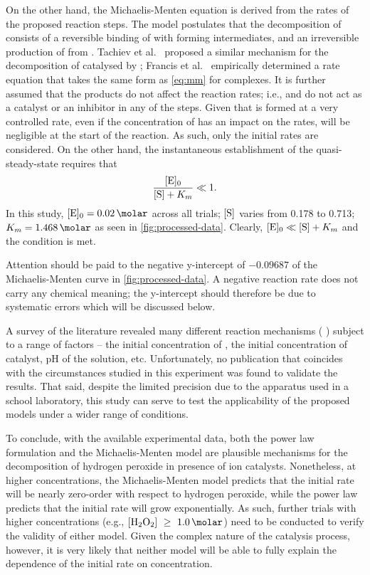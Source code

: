 \documentclass[a4paper, 12pt]{article}
\begin{document}
On the other hand, the Michaelis-Menten equation is derived from the rates of the proposed reaction steps. The model postulates that the decomposition of  consists of a reversible binding of  with  forming  intermediates, and an irreversible production of  from . Tachiev et al.~\cite{tachiev} proposed a similar mechanism for the decomposition of  catalysed by ; Francis et al.~\cite{Fe_mm} empirically determined a rate equation that takes the same form as \cref{eq:mm} for  complexes. It is further assumed that the products do not affect the reaction rates; i.e.,  and  do not act as a catalyst or an inhibitor in any of the steps. Given that  is formed at a very controlled rate, even if the concentration of  has an impact on the rates, \ce{[O2]} will be negligible at the start of the reaction. As such, only the initial rates are considered. On the other hand, the instantaneous establishment of the quasi-steady-state requires that~\cite{mathematical_biology} \[ \frac{\ce{[E]_0}}{\ce{[S]} + K_m} \ll 1 . \] In this study, $\ce{[E]_0} = \SI{0.02}{\molar}$ across all trials; $\ce{[S]}$ varies from \SI{0.178}{\molar} to \SI{0.713}{\molar}; $K_m = \SI{1.468}{\molar}$ as seen in \cref{fig:processed-data}. Clearly, $\ce{[E]_0} \ll \ce{[S]} + K_m$ and the condition is met.

Attention should be paid to the negative y-intercept of $-0.09687$ of the Michaelis-Menten curve in \cref{fig:processed-data}. A negative reaction rate does not carry any chemical meaning; the y-intercept should therefore be due to systematic errors which will be discussed below.

A survey of the literature revealed many different reaction mechanisms (\cite{pseudo_first_order} \cite{Fe_mm} \cite{de_laat} \cite{tachiev}) subject to a range of factors -- the initial concentration of , the initial concentration of  catalyst, pH of the solution, etc. Unfortunately, no publication that coincides with the circumstances studied in this experiment was found to validate the results. That said, despite the limited precision due to the apparatus used in a school laboratory, this study can serve to test the applicability of the proposed models under a wider range of conditions.

To conclude, with the available experimental data, both the power law formulation and the Michaelis-Menten model are plausible mechanisms for the decomposition of hydrogen peroxide in presence of  ion catalysts. Nonetheless, at higher  concentrations, the Michaelis-Menten model predicts that the initial rate will be nearly zero-order with respect to hydrogen peroxide, while the power law predicts that the initial rate will grow exponentially. As such, further trials with higher  concentrations (e.g., $\ce{[H2O2]}~\geq~\SI{1.0}{\molar}$) need to be conducted to verify the validity of either model. Given the complex nature of the catalysis process, however, it is very likely that neither model will be able to fully explain the dependence of the initial rate on  concentration.
\end{document}
